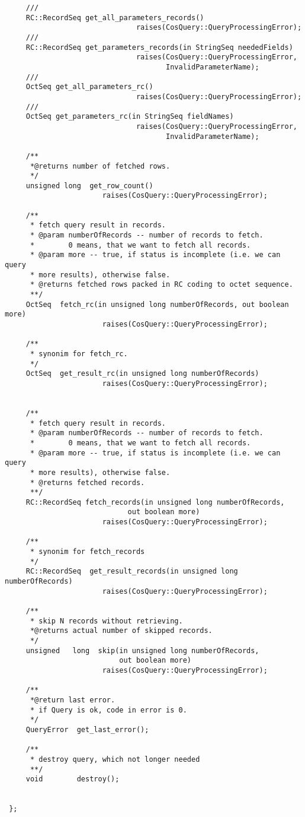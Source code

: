 \documentclass[10pt]{article}
\begin{document}
\begin{verbatim}
     ///
     RC::RecordSeq get_all_parameters_records() 
                               raises(CosQuery::QueryProcessingError);
     ///
     RC::RecordSeq get_parameters_records(in StringSeq neededFields)
                               raises(CosQuery::QueryProcessingError,
                                      InvalidParameterName);
     ///
     OctSeq get_all_parameters_rc() 
                               raises(CosQuery::QueryProcessingError);
     ///
     OctSeq get_parameters_rc(in StringSeq fieldNames)
                               raises(CosQuery::QueryProcessingError,
                                      InvalidParameterName);

     /**
      *@returns number of fetched rows.
      */
     unsigned long  get_row_count() 
                       raises(CosQuery::QueryProcessingError);
     
     /**
      * fetch query result in records.
      * @param numberOfRecords -- number of records to fetch.
      *        0 means, that we want to fetch all records.
      * @param more -- true, if status is incomplete (i.e. we can query
      * more results), otherwise false.
      * @returns fetched rows packed in RC coding to octet sequence.
      **/
     OctSeq  fetch_rc(in unsigned long numberOfRecords, out boolean more)
                       raises(CosQuery::QueryProcessingError);

     /**
      * synonim for fetch_rc.
      */
     OctSeq  get_result_rc(in unsigned long numberOfRecords)
                       raises(CosQuery::QueryProcessingError);


     /**
      * fetch query result in records.
      * @param numberOfRecords -- number of records to fetch.
      *        0 means, that we want to fetch all records.
      * @param more -- true, if status is incomplete (i.e. we can query
      * more results), otherwise false.
      * @returns fetched records.
      **/
     RC::RecordSeq fetch_records(in unsigned long numberOfRecords, 
                             out boolean more)
                       raises(CosQuery::QueryProcessingError);

     /**
      * synonim for fetch_records
      */
     RC::RecordSeq  get_result_records(in unsigned long numberOfRecords)
                       raises(CosQuery::QueryProcessingError);

     /**
      * skip N records without retrieving.
      *@returns actual number of skipped records.
      */
     unsigned   long  skip(in unsigned long numberOfRecords,
                           out boolean more)
                       raises(CosQuery::QueryProcessingError);

     /**
      *@return last error.
      * if Query is ok, code in error is 0.
      */
     QueryError  get_last_error();

     /**
      * destroy query, which not longer needed
      **/
     void        destroy();


 };
\end{verbatim}
\end{document}
